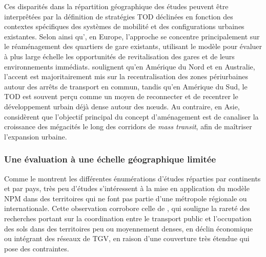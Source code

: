 \begin{refsegment}
Ces disparités dans la répartition géographique des études peuvent être interprêtées par la définition de stratégies \acrshort{TOD} déclinées en fonction des contextes spécifiques des systèmes de mobilité et des configurations urbaines existantes. Selon \textcolor{blue}{\textcite[]{bertolini_cities_2015}} ainsi qu'\textcolor{blue}{\textcite[]{ivan_evaluation_2012}}, en Europe, l'approche se concentre principalement sur le réaménagement des quartiers de gare existants, utilisant le modèle pour évaluer à plus large échelle les opportunités de revitalisation des gares et de leurs environnements immédiats. \textcolor{blue}{\textcite[42]{lyu_developing_2016}} soulignent qu'en Amérique du Nord et en Australie, l'accent est majoritairement mis sur la recentralisation des zones périurbaines autour des arrêts de transport en commun, tandis qu'en Amérique du Sud, le \acrshort{TOD} est souvent perçu comme un moyen de reconnecter et de recentrer le développement urbain déjà dense autour des nœuds. Au contraire, en Asie, \textcolor{blue}{\textcite[42]{lyu_developing_2016}} considèrent que l'objectif principal du concept d'aménagement est de canaliser la croissance des mégacités le long des corridors de \textsl{mass transit}, afin de maîtriser l'expansion urbaine.%

\subsubsection*{Une évaluation à une échelle géographique limitée
    \label{chap6:litterature-taille-urbaine}
    }

Comme le montrent les différentes énumérations d'études réparties par continents et par pays, très peu d'études s'intéressent à la mise en application du modèle \acrshort{NPM} dans des territoires qui ne font pas partie d'une métropole régionale ou internationale. Cette observation corrobore celle de \textcolor{blue}{\textcite[111]{nigro_land_2019}}, qui souligne la rareté des recherches portant sur la coordination entre le transport public et l'occupation des sols dans des territoires peu ou moyennement denses, en déclin économique ou intégrant des réseaux de \acrfull{TGV}, en raison d'une couverture très étendue qui pose des contraintes.%


\end{refsegment}

